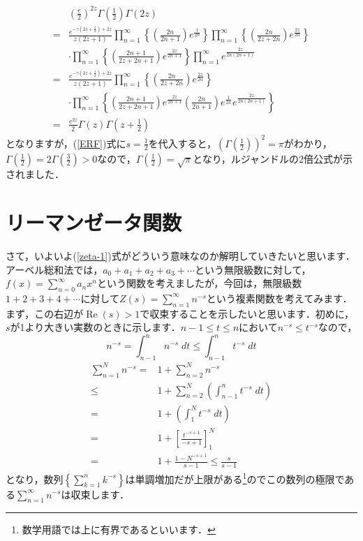 \documentclass[./main]{subfile}
\begin{document}
\begin{align*}
&\left(\frac{e}{2}\right)^{2z}\Gamma\left(\frac{1}{2}\right)\Gamma(2z)\\
=&\frac{e^{-\gamma \left(2z+\frac{1}{2}\right)+2z}}{z(2z+1)}\prod_{n=1}^{\infty}\left\{\left(\frac{2n}{2n+1}\right)e^{\frac{1}{2n}}\right\}\prod_{n=1}^{\infty}\left\{\left(\frac{2n}{2z+2n}\right)e^{\frac{2z}{2n}}\right\}\\
&\cdot\prod_{n=1}^{\infty}\left\{\left(\frac{2n+1}{2z+2n+1}\right)e^{\frac{2z}{2n+1}}\right\}\prod_{n=1}^{\infty}e^{\frac{2z}{2n(2n+1)}}\\
=&\frac{e^{-\gamma \left(2z+\frac{1}{2}\right)+2z}}{z(2z+1)}\prod_{n=1}^{\infty}\left\{\left(\frac{2n}{2z+2n}\right)e^{\frac{2z}{2n}}\right\}\\
&\cdot\prod_{n=1}^{\infty}\left\{\left(\frac{2n+1}{2z+2n+1}\right)e^{\frac{2z}{2n+1}}\left(\frac{2n}{2n+1}\right)e^{\frac{1}{2n}}e^{\frac{2z}{2n(2n+1)}}\right\}\\
=&\frac{e^{2z}}{2}\Gamma(z)\Gamma\left(z+\frac{1}{2}\right)
\end{align*}
となりますが，(\ref{ERF})式に$s=\frac{1}{2}$を代入すると，$\left(\Gamma\left(\frac{1}{2}\right)\right)^2=\pi$がわかり，$\Gamma\left(\frac{1}{2}\right)=2\Gamma\left(\frac{3}{2}\right)>0$なので，$\Gamma\left(\frac{1}{2}\right)=\sqrt{\pi}$となり，ルジャンドルの2倍公式が示されました．

\section{リーマンゼータ関数}

さて，いよいよ(\ref{zeta-1})式がどういう意味なのか解明していきたいと思います．アーベル総和法では，$a_0+a_1+a_2+a_3+\cdots$という無限級数に対して，$f(x)=\sum_{n=0}^{\infty}a_nx^n$という関数を考えましたが，今回は，無限級数$1+2+3+4+\cdots$に対して$Z(s)=\sum_{n=1}^{\infty}n^{-s}$という複素関数を考えてみます．まず，この右辺が$\operatorname{Re}(s)>1$で収束することを示したいと思います．初めに，$s$が1より大きい実数のときに示します．$n-1\leq t\leq n$において$n^{-s}\leq t^{-s}$なので，
\[
n^{-s}=\int_{n-1}^nn^{-s}\;dt\leq\int_{n-1}^nt^{-s}\;dt
\]
\begin{align*}
\sum_{n=1}^{N}n^{-s}=&1+\sum_{n=2}^{N}n^{-s}\\
\leq&1+\sum_{n=2}^{N}\left(\int_{n-1}^nt^{-s}\;dt\right)\\
=&1+\left(\int_1^{N}t^{-s}\;dt\right)\\
=&1+\left[\frac{t^{-s+1}}{-s+1}\right]_1^{N}\\
=&1+\frac{1-N^{-s+1}}{s-1}\leq\frac{s}{s-1}
\end{align*}
となり，数列$\left\{\sum_{k=1}^nk^{-s}\right\}$は単調増加だが上限がある\footnote{数学用語では上に有界であるといいます．}のでこの数列の極限である$\sum_{n=1}^{\infty}n^{-s}$は収束します．
\end{document}

